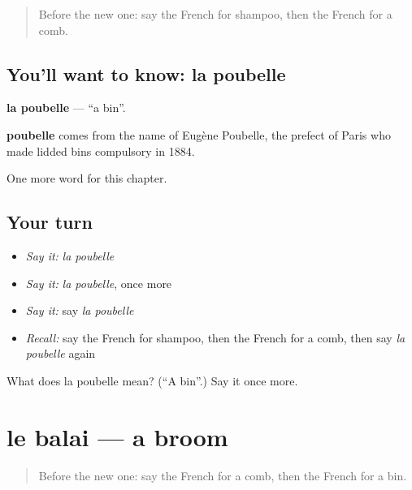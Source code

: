 \label{lesson:FR-C114-poubelle}



\begin{quote}
Before the new one: say the French for shampoo, then the French for a comb.
\end{quote}

\subsection*{You'll want to know: la poubelle}
\textbf{la poubelle} — \textquotedblleft{}a bin\textquotedblright{}.

\begin{cousinweb}
\textbf{poubelle} comes from the name of Eugène Poubelle, the prefect of Paris who made lidded bins compulsory in 1884.
\end{cousinweb}

\begin{grammarlens}[title={What you've built}]
One more word for this chapter.
\end{grammarlens}

\subsection*{Your turn}
\begin{itemize}
\raggedright
  \item \emph{Say it:} \emph{la poubelle}
  \item \emph{Say it:} \emph{la poubelle}, once more
  \item \emph{Say it:} say \emph{la poubelle}
  \item \emph{Recall:} say the French for shampoo, then the French for a comb, then say \emph{la poubelle} again
\end{itemize}

\begin{tcolorbox}[breakable,colback=teal!4,colframe=teal!35!black,title={Before you move on}]
What does la poubelle mean? (\textquotedblleft{}A bin\textquotedblright{}.) Say it once more.
\end{tcolorbox}
\section[le balai]{le balai — a broom}

\label{lesson:FR-C114-balai}



\begin{quote}
Before the new one: say the French for a comb, then the French for a bin.
\end{quote}

